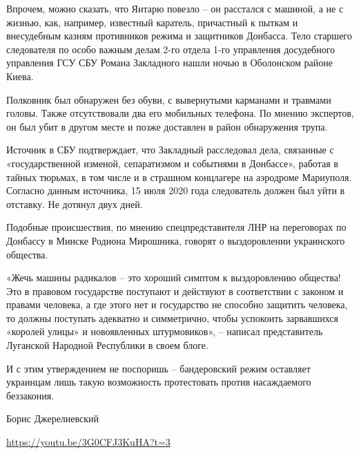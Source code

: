 Впрочем, можно сказать, что Янтарю повезло – он расстался с машиной, а не с
жизнью, как, например, известный каратель, причастный к пыткам и внесудебным
казням противников режима и защитников Донбасса. Тело старшего следователя по
особо важным делам 2-го отдела 1-го управления досудебного управления ГСУ СБУ
Романа Закладного нашли ночью в Оболонском районе Киева.

Полковник был обнаружен без обуви, с вывернутыми карманами и травмами головы.
Также отсутствовали два его мобильных телефона. По мнению экспертов, он был
убит в другом месте и позже доставлен в район обнаружения трупа.

Источник в СБУ подтверждает, что Закладный расследовал дела, связанные с
«государственной изменой, сепаратизмом и событиями в Донбассе», работая в
тайных тюрьмах, в том числе и в страшном концлагере на аэродроме Мариуполя.
Согласно данным источника, 15 июля 2020 года следователь должен был уйти в
отставку. Не дотянул двух дней.

Подобные происшествия, по мнению спецпредставителя ЛНР на переговорах по
Донбассу в Минске Родиона Мирошника, говорят о выздоровлении украинского
общества.

«Жечь машины радикалов – это хороший симптом к выздоровлению общества! Это в
правовом государстве поступают и действуют в соответствии с законом и правами
человека, а где этого нет и государство не способно защитить человека, то
должны поступать адекватно и симметрично, чтобы успокоить зарвавшихся «королей
улицы» и новоявленных штурмовиков», – написал представитель Луганской Народной
Республики в своем блоге.

И с этим утверждением не поспоришь – бандеровский режим оставляет украинцам
лишь такую возможность протестовать против насаждаемого беззакония.

Борис Джерелиевский

\url{https://youtu.be/3G0CFJ3KuHA?t=3}
